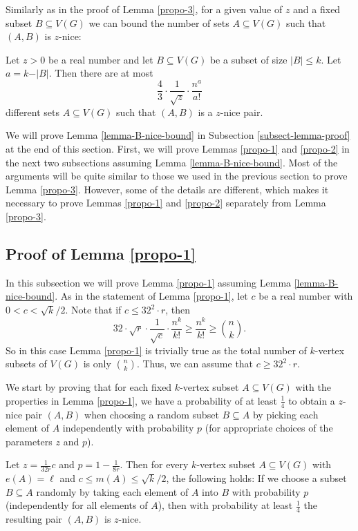 Similarly as in the proof of Lemma \ref{propo-3}, for a given value of $z$ and a fixed subset $B\subseteq V(G)$ we can bound the number of sets $A\subseteq V(G)$ such that $(A,B)$ is $z$-nice:

\begin{lemma}\label{lemma-B-nice-bound}Let $z>0$ be a real number and let $B\subseteq V(G)$ be a subset of size $\vert B\vert\leq k$. Let $a=k-\vert B\vert$. Then there are at most 
\[\frac{4}{3}\cdot\frac{1}{\sqrt{z}}\cdot \frac{n^a}{a!}\]
different sets $A\subseteq V(G)$ such that $(A,B)$ is a $z$-nice pair.
\end{lemma}

We will prove Lemma \ref{lemma-B-nice-bound} in Subsection \ref{subsect-lemma-proof} at the end of this section. First, we will prove Lemmas \ref{propo-1} and \ref{propo-2} in the next two subsections assuming Lemma \ref{lemma-B-nice-bound}. Most of the arguments will be quite similar to those we used in the previous section to prove Lemma \ref{propo-3}. However, some of the details are different, which makes it necessary to prove Lemmas \ref{propo-1} and \ref{propo-2} separately from Lemma \ref{propo-3}.

\subsection{Proof of Lemma \ref{propo-1}}

In this subsection we will prove Lemma \ref{propo-1} assuming Lemma \ref{lemma-B-nice-bound}. As in the statement of Lemma \ref{propo-1}, let $c$ be a real number with $0<c<\sqrt{k}/2$. Note that if $c\leq 32^2 \cdot r$, then
\[32\cdot \sqrt{r}\cdot \frac{1}{\sqrt{c}}\cdot \frac{n^k}{k!}\geq \frac{n^k}{k!}\geq {n \choose k}.\]
So in this case Lemma \ref{propo-1} is trivially true as the total number of $k$-vertex subsets of $V(G)$ is only ${n\choose k}$. Thus, we can assume that $c\geq 32^2 \cdot r$.

We start by proving that for each fixed $k$-vertex subset $A\subseteq V(G)$ with the properties in Lemma \ref{propo-1}, we have a probability of at least $\frac{1}{4}$ to obtain a $z$-nice pair $(A,B)$ when choosing a random subset $B\subseteq A$ by picking each element of $A$ independently with probability $p$ (for appropriate choices of the parameters $z$ and $p$).

\begin{lemma}\label{lemma-A-1}Let $z=\frac{1}{32r}c$ and $p=1-\frac{1}{8r}$. Then for every $k$-vertex subset $A\subseteq V(G)$ with $e(A)=\ell$ and $c\leq m(A)\leq \sqrt{k}/2$, the following holds: If we choose a subset $B\subseteq A$ randomly by taking each element of $A$ into $B$ with probability $p$ (independently for all elements of $A$), then with probability at least $\frac{1}{4}$ the resulting pair $(A,B)$ is $z$-nice.
\end{lemma}

